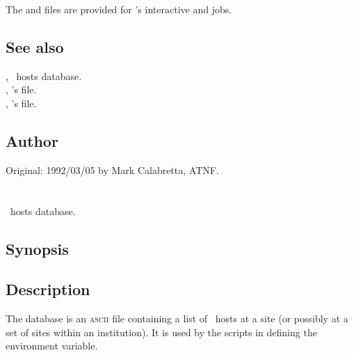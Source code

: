 \noindent
The  and  files are provided for
's interactive and  jobs.

\subsection*{See also}

, \aipspp\ hosts database.\\
, 's  file.\\
, 's  file.

\subsection*{Author}

Original: 1992/03/05 by Mark Calabretta, ATNF.


\newpage
\section{}
\label{aipshosts}




\aipspp\ hosts database.

\subsection*{Synopsis}

\begin{synopsis}
\end{synopsis}

\subsection*{Description}

The  database is an \textsc{ascii} file containing a list of
\aipspp\ hosts at a site (or possibly at a set of sites within an
institution).  It is used by the  scripts in
defining the  environment variable.

